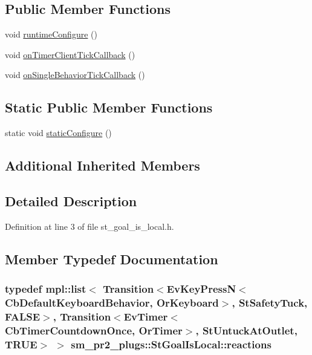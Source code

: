 \subsection*{Public Member Functions}
\begin{DoxyCompactItemize}
\item 
void \hyperlink{structsm__pr2__plugs_1_1StGoalIsLocal_aeddacc72a9eefe2a51d24564874f1610}{runtime\+Configure} ()
\item 
void \hyperlink{structsm__pr2__plugs_1_1StGoalIsLocal_a3a851e3468f6b247139f16abd1b91af3}{on\+Timer\+Client\+Tick\+Callback} ()
\item 
void \hyperlink{structsm__pr2__plugs_1_1StGoalIsLocal_a4d5abf255b17a81fe4a758a07f502e7d}{on\+Single\+Behavior\+Tick\+Callback} ()
\end{DoxyCompactItemize}
\subsection*{Static Public Member Functions}
\begin{DoxyCompactItemize}
\item 
static void \hyperlink{structsm__pr2__plugs_1_1StGoalIsLocal_a7fde75ffa3d95e2f5153c35596817ab4}{static\+Configure} ()
\end{DoxyCompactItemize}
\subsection*{Additional Inherited Members}


\subsection{Detailed Description}


Definition at line 3 of file st\+\_\+goal\+\_\+is\+\_\+local.\+h.



\subsection{Member Typedef Documentation}
\subsubsection[{\texorpdfstring{reactions}{reactions}}]{\setlength{\rightskip}{0pt plus 5cm}typedef mpl\+::list$<$ Transition$<$Ev\+Key\+PressN$<$Cb\+Default\+Keyboard\+Behavior, {\bf Or\+Keyboard}$>$, {\bf St\+Safety\+Tuck}, {\bf F\+A\+L\+SE}$>$, Transition$<$Ev\+Timer$<$Cb\+Timer\+Countdown\+Once, {\bf Or\+Timer}$>$, {\bf St\+Untuck\+At\+Outlet}, {\bf T\+R\+UE}$>$ $>$ {\bf sm\+\_\+pr2\+\_\+plugs\+::\+St\+Goal\+Is\+Local\+::reactions}}\hypertarget{structsm__pr2__plugs_1_1StGoalIsLocal_a5e2307f3b40c73716bdb763e1d92dce2}{}\label{structsm__pr2__plugs_1_1StGoalIsLocal_a5e2307f3b40c73716bdb763e1d92dce2}


